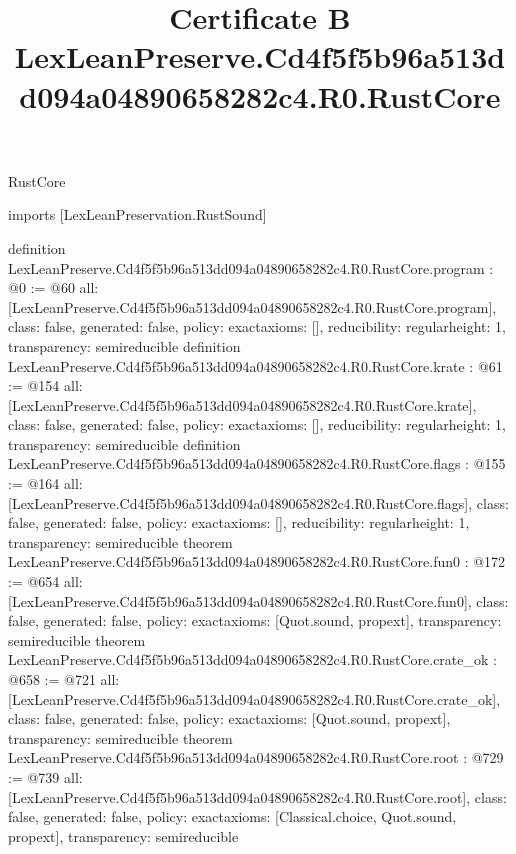 \begin{lexlean}{RustCore}
\title{Certificate B LexLeanPreserve.Cd4f5f5b96a513dd094a04890658282c4.R0.RustCore}
\begin{coremodule}
imports [LexLeanPreservation.RustSound]

definition LexLeanPreserve.Cd4f5f5b96a513dd094a04890658282c4.R0.RustCore.program : @0 := @60 {
  all: [LexLeanPreserve.Cd4f5f5b96a513dd094a04890658282c4.R0.RustCore.program],
  class: false,
  generated: false,
  policy: exact{axioms: []},
  reducibility: regular{height: 1},
  transparency: semireducible
}
definition LexLeanPreserve.Cd4f5f5b96a513dd094a04890658282c4.R0.RustCore.krate : @61 := @154 {
  all: [LexLeanPreserve.Cd4f5f5b96a513dd094a04890658282c4.R0.RustCore.krate],
  class: false,
  generated: false,
  policy: exact{axioms: []},
  reducibility: regular{height: 1},
  transparency: semireducible
}
definition LexLeanPreserve.Cd4f5f5b96a513dd094a04890658282c4.R0.RustCore.flags : @155 := @164 {
  all: [LexLeanPreserve.Cd4f5f5b96a513dd094a04890658282c4.R0.RustCore.flags],
  class: false,
  generated: false,
  policy: exact{axioms: []},
  reducibility: regular{height: 1},
  transparency: semireducible
}
theorem LexLeanPreserve.Cd4f5f5b96a513dd094a04890658282c4.R0.RustCore.fun0 : @172 := @654 {
  all: [LexLeanPreserve.Cd4f5f5b96a513dd094a04890658282c4.R0.RustCore.fun0],
  class: false,
  generated: false,
  policy: exact{axioms: [Quot.sound, propext]},
  transparency: semireducible
}
theorem LexLeanPreserve.Cd4f5f5b96a513dd094a04890658282c4.R0.RustCore.crate_ok : @658 := @721 {
  all: [LexLeanPreserve.Cd4f5f5b96a513dd094a04890658282c4.R0.RustCore.crate_ok],
  class: false,
  generated: false,
  policy: exact{axioms: [Quot.sound, propext]},
  transparency: semireducible
}
theorem LexLeanPreserve.Cd4f5f5b96a513dd094a04890658282c4.R0.RustCore.root : @729 := @739 {
  all: [LexLeanPreserve.Cd4f5f5b96a513dd094a04890658282c4.R0.RustCore.root],
  class: false,
  generated: false,
  policy: exact{axioms: [Classical.choice, Quot.sound, propext]},
  transparency: semireducible
}


\end{coremodule}
\end{lexlean}
